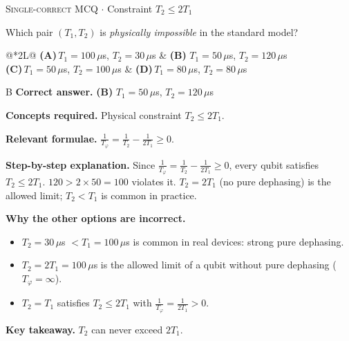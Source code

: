 \documentclass[11pt,a4paper]{article}
\newcommand{\optlabel}[1]{\textbf{(#1)}}
\newcommand{\correctlabel}[1]{\textcolor{okgreen}{\textbf{(#1)}\,\ding{51}}}
\newenvironment{qitem}[1]{\begin{list}{}{\setlength{\leftmargin}{3.3em}\setlength{\labelwidth}{3.1em}%
  \setlength{\labelsep}{0.2em}\setlength{\topsep}{3pt}\setlength{\parsep}{3pt}}\item[\textbf{Q.#1}\hfill]}{\end{list}}
\newcommand{\qsep}{\par\vspace{2pt}{\color{black!15}\hrule}\vspace{4pt}}
\newcommand{\qmeta}[2]{{\footnotesize\color{black!60}\textsc{#1} \;$\cdot$\; #2}\par}
\begin{document}
\begin{qitem}{28}
\qmeta{Single-correct MCQ}{Constraint $T_2 \le 2T_1$}
Which pair $(T_1, T_2)$ is \emph{physically impossible} in the standard model?
\par\smallskip\noindent\begin{tabularx}{\linewidth}{@{}*{2}{L}@{}}
\optlabel{A}\,$T_1 = 100\,\mu$s, $T_2 = 30\,\mu$s & \correctlabel{B}\,$T_1 = 50\,\mu$s, $T_2 = 120\,\mu$s \\[3pt]
\optlabel{C}\,$T_1 = 50\,\mu$s, $T_2 = 100\,\mu$s & \optlabel{D}\,$T_1 = 80\,\mu$s, $T_2 = 80\,\mu$s
\end{tabularx}
\end{qitem}
\begin{solbox}{B}
\textbf{\color{brand}Correct answer.} \textcolor{okgreen}{\textbf{(B)}} $T_1 = 50\,\mu$s, $T_2 = 120\,\mu$s

\textbf{\color{brand}Concepts required.} Physical constraint $T_2 \le 2T_1$.

\textbf{\color{brand}Relevant formulae.} $\frac{1}{T_\varphi} = \frac1{T_2} - \frac{1}{2T_1} \ge 0$.

\textbf{\color{brand}Step-by-step explanation.} Since $\frac1{T_\varphi} = \frac1{T_2} - \frac1{2T_1} \ge 0$, every qubit satisfies $T_2 \le 2T_1$. $120 > 2\times50 = 100$ violates it. $T_2 = 2T_1$
(no pure dephasing) is the allowed limit; $T_2 < T_1$ is common in practice.

\textbf{\color{brand}Why the other options are incorrect.}
\begin{itemize}[leftmargin=2.4em, itemsep=1pt, topsep=2pt]
\item[\textbf{(A)}] $T_2 = 30\,\mu$s $< T_1 = 100\,\mu$s is common in real devices: strong pure dephasing.
\item[\textbf{(C)}] $T_2 = 2T_1 = 100\,\mu$s is the allowed limit of a qubit without pure dephasing ($T_\varphi = \infty$).
\item[\textbf{(D)}] $T_2 = T_1$ satisfies $T_2 \le 2T_1$ with $\frac1{T_\varphi} = \frac{1}{2T_1} > 0$.
\end{itemize}
\textbf{\color{brand}Key takeaway.} $T_2$ can never exceed $2T_1$.
\end{solbox}
\qsep
\end{document}

